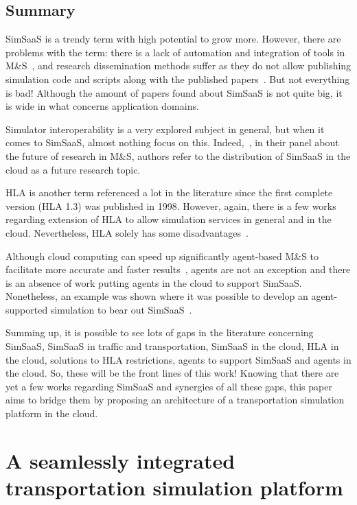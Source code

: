 \documentclass[conference]{IEEEtran}
\begin{document}
\subsection{Summary}

SimSaaS is a trendy term with high potential to grow more. However, there are problems with the term: there is a lack of automation and integration of tools in M\&S~\cite{Wang:2015:SSM:2723553.2723554}, and research dissemination methods suffer as they do not allow publishing simulation code and scripts along with the published papers~\cite{Sliman2013611}. But not everything is bad! Although the amount of papers found about SimSaaS is not quite big, it is wide in what concerns application domains.

Simulator interoperability is a very explored subject in general, but when it comes to SimSaaS, almost nothing focus on this. Indeed,~\cite{Yilmaz:2014:PFR:2693848.2694204}, in their panel about the future of research in M\&S, authors refer to the distribution of SimSaaS in the cloud as a future research topic.

HLA is another term referenced a lot in the literature since the first complete version (HLA 1.3) was published in 1998. However, again, there is a few works regarding extension of HLA to allow simulation services in general and in the cloud. Nevertheless, HLA solely has some disadvantages~\cite{Yilmaz01092006}\cite{Tolk:2010:UFA:2433508.2433550}.

Although cloud computing can speed up significantly agent-based M\&S to facilitate more accurate and faster results~\cite{Taylor:2014:TCC:2693848.2693884}, agents are not an exception and there is an absence of work putting agents in the cloud to support SimSaaS. Nonetheless, an example was shown where it was possible to develop an agent-supported simulation to bear out SimSaaS~\cite{Shao:2009:SSE:1639809.1639859}.

Summing up, it is possible to see lots of gaps in the literature concerning SimSaaS, SimSaaS in traffic and transportation, SimSaaS in the cloud, HLA in the cloud, solutions to HLA restrictions, agents to support SimSaaS and agents in the cloud. So, these will be the front lines of this work! Knowing that there are yet a few works regarding SimSaaS and synergies of all these gaps, this paper aims to bridge them by proposing an architecture of a transportation simulation platform in the cloud. 


\section{A seamlessly integrated transportation simulation platform}
\end{document}
